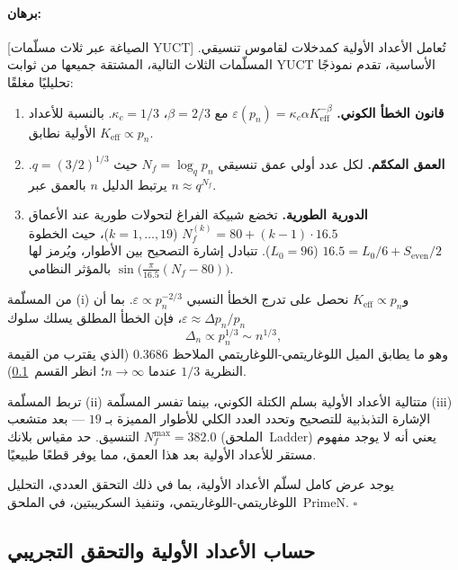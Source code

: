 \documentclass[11pt,a4paper]{article}
\renewenvironment{proof}{\paragraph{برهان:}}{\hfill$\square$}
\begin{document}
	\begin{proof}[الصياغة عبر ثلاث مسلّمات YUCT]
		تُعامل الأعداد الأولية كمدخلات لقاموس تنسيقي. المسلّمات الثلاث التالية، المشتقة جميعها من ثوابت YUCT الأساسية، تقدم نموذجًا تحليليًا مغلقًا:
		\begin{enumerate}[label=(\roman*)]
			\item \textbf{قانون الخطأ الكوني.} \(\varepsilon(p_n) = \kappa_c \alpha K_{\mathrm{eff}}^{-\beta}\) مع \(\beta = 2/3\)، \(\kappa_c = 1/3\). بالنسبة للأعداد الأولية نطابق \(K_{\mathrm{eff}} \propto p_n\).
			\item \textbf{العمق المكمّم.} لكل عدد أولي عمق تنسيقي \(N_f = \log_q p_n\) حيث \(q = (3/2)^{1/3}\). يرتبط الدليل \(n\) بالعمق عبر \(n \approx q^{N_f}\).
			\item \textbf{الدورية الطورية.} تخضع شبيكة الفراغ لتحولات طورية عند الأعماق \(N_f^{(k)} = 80 + (k-1)\cdot 16.5\) (\(k=1,\dots,19\))، حيث الخطوة \(16.5 = L_0/6 + S_{\mathrm{even}}/2\) (\(L_0=96\)). تتبادل إشارة التصحيح بين الأطوار، ويُرمز لها بالمؤثر النظامي \(\sin\bigl(\frac{\pi}{16.5}(N_f-80)\bigr)\).
		\end{enumerate}
		
		من المسلّمة (i) و\(K_{\mathrm{eff}} \propto p_n\) نحصل على تدرج الخطأ النسبي \(\varepsilon \propto p_n^{-2/3}\). بما أن \(\varepsilon \approx \Delta p_n / p_n\)، فإن الخطأ المطلق يسلك سلوك
		\[
		\Delta_n \propto p_n^{1/3} \sim n^{1/3},
		\]
		وهو ما يطابق الميل اللوغاريتمي-اللوغاريتمي الملاحظ \(0.3686\) (الذي يقترب من القيمة النظرية \(1/3\) عندما \(n\to\infty\)؛ انظر القسم~\ref{sec:prime-empirical}).
		
		تربط المسلّمة (ii) متتالية الأعداد الأولية بسلم الكتلة الكوني، بينما تفسر المسلّمة (iii) الإشارة التذبذبية للتصحيح وتحدد العدد الكلي للأطوار المميزة بـ \(19\) — بعد متشعب التنسيق. حد مقياس بلانك \(N_f^{\max} = 382.0\) (الملحق~Ladder) يعني أنه لا يوجد مفهوم مستقر للأعداد الأولية بعد هذا العمق، مما يوفر قطعًا طبيعيًا.
		
		يوجد عرض كامل لسلّم الأعداد الأولية، بما في ذلك التحقق العددي، التحليل اللوغاريتمي-اللوغاريتمي، وتنفيذ السكريبتين، في الملحق~PrimeN.
	\end{proof}
	
	\subsection{حساب الأعداد الأولية والتحقق التجريبي}
	\label{sec:prime-empirical}
	
\end{document}
